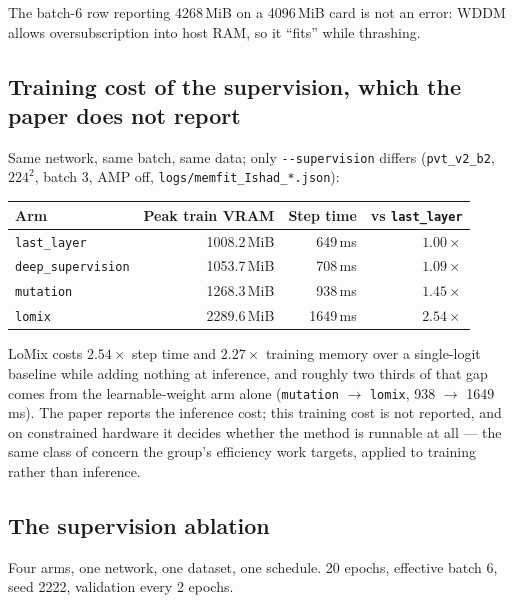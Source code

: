 \documentclass[11pt,a4paper]{article}
\newcommand{\code}[1]{\texttt{\small #1}}
\begin{document}
The batch-6 row reporting 4268\,MiB on a 4096\,MiB card is not an error: WDDM
allows oversubscription into host RAM, so it ``fits'' while thrashing.

\subsection{Training cost of the supervision, which the paper does not report}

Same network, same batch, same data; only \code{-{}-supervision} differs
(\code{pvt\_v2\_b2}, $224^2$, batch 3, AMP off,
\code{logs/memfit\_Ishad\_*.json}):

\begin{center}
\begin{tabular}{@{}lrrr@{}}
\toprule
\textbf{Arm} & \textbf{Peak train VRAM} & \textbf{Step time} &
\textbf{vs \code{last\_layer}} \\
\midrule
\code{last\_layer} & 1008.2\,MiB & 649\,ms & $1.00\times$ \\
\code{deep\_supervision} & 1053.7\,MiB & 708\,ms & $1.09\times$ \\
\code{mutation} & 1268.3\,MiB & 938\,ms & $1.45\times$ \\
\code{lomix} & 2289.6\,MiB & 1649\,ms & $\mathbf{2.54\times}$ \\
\bottomrule
\end{tabular}
\end{center}

LoMix costs $2.54\times$ step time and $2.27\times$ training memory over a
single-logit baseline while adding nothing at inference, and roughly two thirds
of that gap comes from the learnable-weight arm alone (\code{mutation}
$\rightarrow$ \code{lomix}, 938 $\rightarrow$ 1649\,ms). The paper reports the
inference cost; this training cost is not reported, and on constrained hardware
it decides whether the method is runnable at all --- the same class of concern
the group's efficiency work targets, applied to training rather than inference.

\subsection{The supervision ablation}

Four arms, one network, one dataset, one schedule. 20 epochs, effective batch 6,
seed 2222, validation every 2 epochs.
\end{document}
